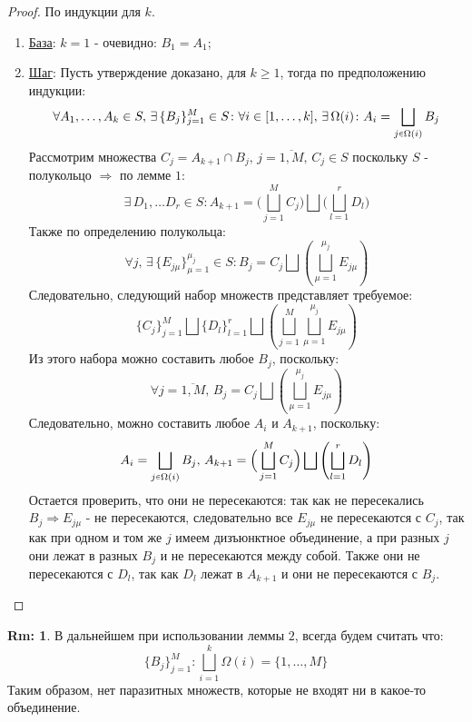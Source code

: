 \documentclass[12pt]{article}
\theoremstyle{definition}
\newtheorem{rem}{Rm:}
\newcommand{\smallerrel}[1]{\mathrel{\mathpalette\smallerrelaux{#1}}}
\newcommand{\smallerrelaux}[2]{\raisebox{.1ex}{\scalebox{.75}{$#1#2$}}}
\newcommand{\smallin}{\smallerrel{\in}}
\begin{document}
\begin{proof}
	По индукции для $k$. 
	\begin{enumerate}[label={(\arabic*)}]
		\item \uline{База}: $k = 1$ - очевидно: $B_1 = A_1$;
	
		\item \uline{Шаг}: Пусть утверждение доказано, для $k \geq 1$, тогда по предположению индукции: 
		$$
			\forall A_1, \dotsc , A_k \in S, \, \exists \, \{B_j\}_{j=1}^{M} \in S \colon \forall i \in [1,\dotsc,k], \, \exists \, \Omega(i) \colon A_i = \bigsqcup\limits_{j \smallin \Omega(i)}B_j
		$$ 
		Рассмотрим множества $C_j = A_{k+1} \cap B_j, \, j = \overline{1,M}, \, C_j \in S$ поскольку $S$ - полукольцо $\Rightarrow$ по лемме $1$:
		$$
			\exists \, D_1, \dotsc D_r \in S \colon A_{k+1} = \Big( \bigsqcup\limits_{j=1}^{M} C_j\Big) \bigsqcup \Big( \bigsqcup\limits_{l = 1}^{r} D_l\Big)
		$$ 
		Также по определению полукольца: 
		$$
			\forall j, \, \exists \, \{E_{j\mu}\}_{\mu = 1}^{\mu_j} \in S \colon B_j = C_j \bigsqcup \left( \bigsqcup\limits_{\mu = 1}^{\mu_j} E_{j\mu} \right)
		$$
		Следовательно, следующий набор множеств представляет требуемое: 
		$$
			\{C_j\}_{j=1}^{M} \bigsqcup \{D_l\}_{l = 1}^{r} \bigsqcup \left( \bigsqcup\limits_{j=1}^{M} \bigsqcup\limits_{\mu = 1}^{\mu_j} E_{j\mu} \right) 
		$$ 
		Из этого набора можно составить любое $B_j$, поскольку:
		$$
			\forall j = \overline{1, M}, \, B_j = C_j \bigsqcup \left( \bigsqcup\limits_{\mu = 1}^{\mu_j} E_{j\mu} \right) 
		$$ 
		Следовательно, можно составить любое $A_i$ и $A_{k+1}$, поскольку: 
		$$
			A_i = \bigsqcup\limits_{j \smallin \Omega(i)}B_j, \, A_{k+1} = \Big( \bigsqcup\limits_{j=1}^{M} C_j\Big) \bigsqcup \left( \bigsqcup\limits_{l = 1}^{r} D_l\right)
		$$ 
		Остается проверить, что они не пересекаются: так как не пересекались $B_j \Rightarrow E_{j\mu}$ - не пересекаются, следовательно все $E_{j\mu}$ не пересекаются с $C_j$, так как при одном и том же $j$ имеем дизъюнктное объединение, а при разных $j$ они лежат в разных $B_j$ и не пересекаются между собой. Также они не пересекаются с $D_l$, так как $D_l$ лежат в $A_{k+1}$ и они не пересекаются с $B_j$.
	\end{enumerate}
\end{proof}

\begin{rem}
	В дальнейшем при использовании леммы $2$, всегда будем считать что: 
	$$
		\{B_j\}_{j=1}^{M} \colon \bigsqcup\limits_{i=1}^{k} \Omega(i) = \{1,\dotsc,M\}
	$$ 
	Таким образом, нет паразитных множеств, которые не входят ни в какое-то объединение.
\end{rem}
\end{document}
